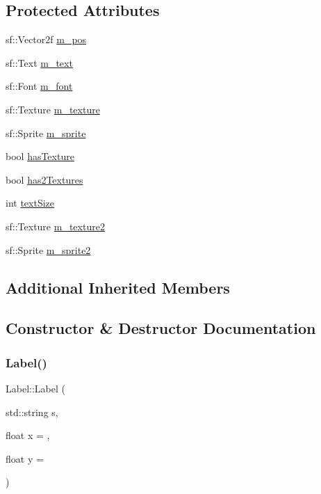 \subsection*{Protected Attributes}
\begin{DoxyCompactItemize}
\item 
sf\+::\+Vector2f \mbox{\hyperlink{class_label_aa36efaf08d314ab5bc4b5b485a39bb0c}{m\+\_\+pos}}
\item 
sf\+::\+Text \mbox{\hyperlink{class_label_a0e97995c1e7cb1d39d9551a797c49a0f}{m\+\_\+text}}
\item 
sf\+::\+Font \mbox{\hyperlink{class_label_a9d6d24ef859678029cbfa81e9b09bc05}{m\+\_\+font}}
\item 
sf\+::\+Texture \mbox{\hyperlink{class_label_a18bb96cd886ac4ce8635eaf4a46520a6}{m\+\_\+texture}}
\item 
sf\+::\+Sprite \mbox{\hyperlink{class_label_a6bcd25a3765c114161392d52ffaeec45}{m\+\_\+sprite}}
\item 
bool \mbox{\hyperlink{class_label_ac72a1cf18a57732ff75fb9f2b0cdf5dc}{has\+Texture}}
\item 
bool \mbox{\hyperlink{class_label_a92252ae476418c9c7a5ed7d9f3b1e4a0}{has2\+Textures}}
\item 
int \mbox{\hyperlink{class_label_ac0e8e759648e9a525d968779a3224b98}{text\+Size}}
\item 
sf\+::\+Texture \mbox{\hyperlink{class_label_a903ee4e1e531bd4abe5d95651f594249}{m\+\_\+texture2}}
\item 
sf\+::\+Sprite \mbox{\hyperlink{class_label_a32ebc8f771cfd06b5f142818c8cc3149}{m\+\_\+sprite2}}
\end{DoxyCompactItemize}
\subsection*{Additional Inherited Members}


\subsection{Constructor \& Destructor Documentation}
\mbox{\label{class_label_aba14ad8fc32c6129f838ed2a80abe2f9}} 
\subsubsection{\texorpdfstring{Label()}{Label()}\hspace{0.1cm}{\footnotesize\ttfamily [1/3]}}
{\footnotesize\ttfamily Label\+::\+Label (\begin{DoxyParamCaption}\item[{std\+::string}]{s,  }\item[{float}]{x = {},  }\item[{float}]{y = {} }\end{DoxyParamCaption})}

